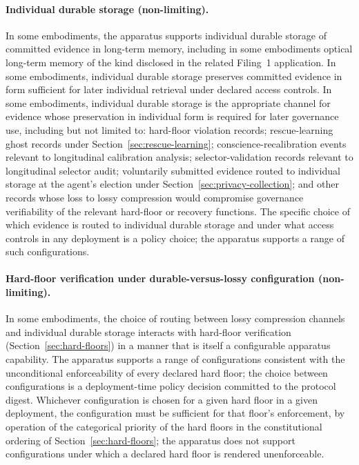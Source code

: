 \documentclass[a4paper,12pt]{article}
\begin{document}
\paragraph{Individual durable storage (non-limiting).}
In some embodiments, the apparatus supports individual durable
storage of committed evidence in long-term memory, including in
some embodiments optical long-term memory of the kind disclosed in
the related Filing~1 application. In some embodiments, individual
durable storage preserves committed evidence in form sufficient for
later individual retrieval under declared access controls. In some
embodiments, individual durable storage is the appropriate channel
for evidence whose preservation in individual form is required for
later governance use, including but not limited to: hard-floor
violation records; rescue-learning ghost records under
Section~\ref{sec:rescue-learning}; conscience-recalibration events
relevant to longitudinal calibration analysis; selector-validation
records relevant to longitudinal selector audit; voluntarily
submitted evidence routed to individual storage at the agent's
election under Section~\ref{sec:privacy-collection}; and other
records whose loss to lossy compression would compromise governance
verifiability of the relevant hard-floor or recovery functions. The
specific choice of which evidence is routed to individual durable
storage and under what access controls in any deployment is a
policy choice; the apparatus supports a range of such configurations.

\paragraph{Hard-floor verification under durable-versus-lossy
configuration (non-limiting).}
In some embodiments, the choice of routing between lossy compression
channels and individual durable storage interacts with hard-floor
verification (Section~\ref{sec:hard-floors}) in a manner that is
itself a configurable apparatus capability. The apparatus supports a
range of configurations consistent with the unconditional
enforceability of every declared hard floor; the choice between
configurations is a deployment-time policy decision committed to the
protocol digest. Whichever configuration is chosen for a given hard
floor in a given deployment, the configuration must be sufficient
for that floor's enforcement, by operation of the categorical
priority of the hard floors in the constitutional ordering of
Section~\ref{sec:hard-floors}; the apparatus does not support
configurations under which a declared hard floor is rendered
unenforceable.
\end{document}
